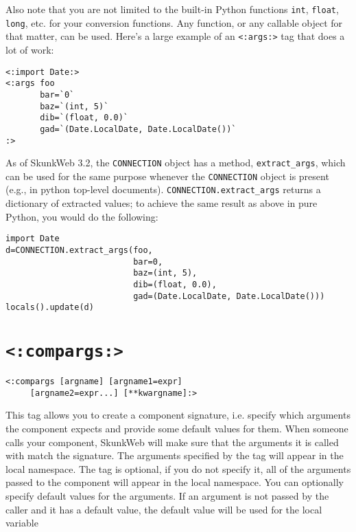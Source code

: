 \documentclass{manual}
\begin{document}
Also note that you are not limited to the built-in Python functions
\texttt{int}, \texttt{float}, \texttt{long}, etc. for your conversion
functions. Any function, or any callable object for that matter, can
be used. Here's a large example of an \texttt{<:args:>} tag
that does a lot of work:

\begin{verbatim}
<:import Date:>
<:args foo
       bar=`0`
       baz=`(int, 5)`
       dib=`(float, 0.0)`
       gad=`(Date.LocalDate, Date.LocalDate())`
:>
\end{verbatim}

As of SkunkWeb 3.2, the \texttt{CONNECTION} object has a method,
\texttt{extract_args}, which can be used for the same purpose whenever
the \texttt{CONNECTION} object is present (e.g., in python top-level
documents).  \texttt{CONNECTION.extract_args} returns a dictionary of
extracted values; to achieve the same result as above in pure Python,
you would do the following:

\begin{verbatim}
import Date
d=CONNECTION.extract_args(foo, 
                          bar=0, 
                          baz=(int, 5),
                          dib=(float, 0.0),
                          gad=(Date.LocalDate, Date.LocalDate()))
locals().update(d)
\end{verbatim}

\section{\texttt{<:compargs:>}}
\label{tagcompargs}

\begin{verbatim}
<:compargs [argname] [argname1=expr] 
     [argname2=expr...] [**kwargname]:>
\end{verbatim}



This tag allows you to create a component signature, i.e. 
specify which arguments the component expects and provide some
default values for them. When someone calls your component, SkunkWeb
will make sure that the arguments it is called with match the 
signature. The arguments specified by the  
tag will appear in the local namespace. The tag is optional, if you do 
not specify it, all of the arguments passed to the component will
appear in the local namespace. You can optionally specify default 
values for the arguments. If an argument is not passed by the 
caller and it has a default value, the default value will be used for the
local variable
\end{document}
